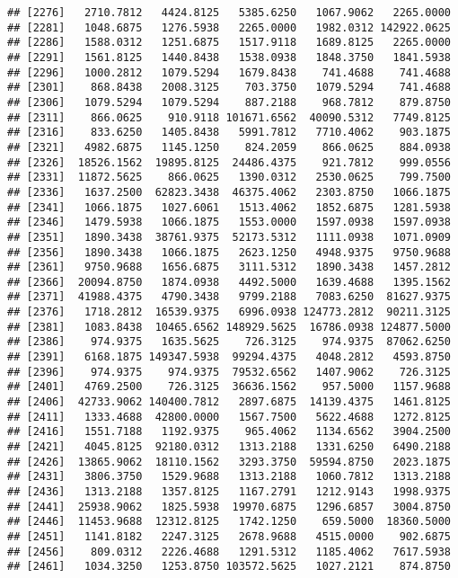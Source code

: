 \documentclass[]{article}
\begin{document}
\begin{verbatim}
## [2276]   2710.7812   4424.8125   5385.6250   1067.9062   2265.0000
## [2281]   1048.6875   1276.5938   2265.0000   1982.0312 142922.0625
## [2286]   1588.0312   1251.6875   1517.9118   1689.8125   2265.0000
## [2291]   1561.8125   1440.8438   1538.0938   1848.3750   1841.5938
## [2296]   1000.2812   1079.5294   1679.8438    741.4688    741.4688
## [2301]    868.8438   2008.3125    703.3750   1079.5294    741.4688
## [2306]   1079.5294   1079.5294    887.2188    968.7812    879.8750
## [2311]    866.0625    910.9118 101671.6562  40090.5312   7749.8125
## [2316]    833.6250   1405.8438   5991.7812   7710.4062    903.1875
## [2321]   4982.6875   1145.1250    824.2059    866.0625    884.0938
## [2326]  18526.1562  19895.8125  24486.4375    921.7812    999.0556
## [2331]  11872.5625    866.0625   1390.0312   2530.0625    799.7500
## [2336]   1637.2500  62823.3438  46375.4062   2303.8750   1066.1875
## [2341]   1066.1875   1027.6061   1513.4062   1852.6875   1281.5938
## [2346]   1479.5938   1066.1875   1553.0000   1597.0938   1597.0938
## [2351]   1890.3438  38761.9375  52173.5312   1111.0938   1071.0909
## [2356]   1890.3438   1066.1875   2623.1250   4948.9375   9750.9688
## [2361]   9750.9688   1656.6875   3111.5312   1890.3438   1457.2812
## [2366]  20094.8750   1874.0938   4492.5000   1639.4688   1395.1562
## [2371]  41988.4375   4790.3438   9799.2188   7083.6250  81627.9375
## [2376]   1718.2812  16539.9375   6996.0938 124773.2812  90211.3125
## [2381]   1083.8438  10465.6562 148929.5625  16786.0938 124877.5000
## [2386]    974.9375   1635.5625    726.3125    974.9375  87062.6250
## [2391]   6168.1875 149347.5938  99294.4375   4048.2812   4593.8750
## [2396]    974.9375    974.9375  79532.6562   1407.9062    726.3125
## [2401]   4769.2500    726.3125  36636.1562    957.5000   1157.9688
## [2406]  42733.9062 140400.7812   2897.6875  14139.4375   1461.8125
## [2411]   1333.4688  42800.0000   1567.7500   5622.4688   1272.8125
## [2416]   1551.7188   1192.9375    965.4062   1134.6562   3904.2500
## [2421]   4045.8125  92180.0312   1313.2188   1331.6250   6490.2188
## [2426]  13865.9062  18110.1562   3293.3750  59594.8750   2023.1875
## [2431]   3806.3750   1529.9688   1313.2188   1060.7812   1313.2188
## [2436]   1313.2188   1357.8125   1167.2791   1212.9143   1998.9375
## [2441]  25938.9062   1825.5938  19970.6875   1296.6857   3004.8750
## [2446]  11453.9688  12312.8125   1742.1250    659.5000  18360.5000
## [2451]   1141.8182   2247.3125   2678.9688   4515.0000    902.6875
## [2456]    809.0312   2226.4688   1291.5312   1185.4062   7617.5938
## [2461]   1034.3250   1253.8750 103572.5625   1027.2121    874.8750

\end{verbatim}
\end{document}
